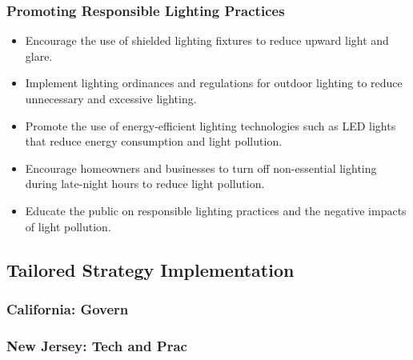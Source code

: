 \subsubsection{Promoting Responsible Lighting Practices}
\begin{itemize}
    \item Encourage the use of shielded lighting fixtures to reduce upward light and glare.
    
    \item Implement lighting ordinances and regulations for outdoor lighting to reduce unnecessary and excessive lighting.
    
    \item Promote the use of energy-efficient lighting technologies such as LED lights that reduce energy consumption and light pollution.
    
    \item Encourage homeowners and businesses to turn off non-essential lighting during late-night hours to reduce light pollution.
    
    \item Educate the public on responsible lighting practices and the negative impacts of light pollution.
\end{itemize}



\subsection{Tailored Strategy Implementation}

\subsubsection{California: Govern}

\subsubsection{New Jersey: Tech and Prac}


